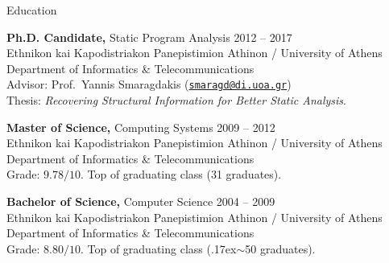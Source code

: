 \documentclass{resume}
\begin{document}
\newcommand{\mytilde}{\raise.17ex\hbox{$\scriptstyle\mathtt{\sim}$}}



\begin{rSection}{Education}

{\bf Ph.D. Candidate,} Static Program Analysis \hfill {2012 -- 2017} \\
Ethnikon kai Kapodistriakon Panepistimion Athinon / University of Athens \\
Department of Informatics \& Telecommunications \\
Advisor: Prof.~Yannis Smaragdakis
(\href{mailto:smaragd@di.uoa.gr}{\nolinkurl{smaragd@di.uoa.gr}}) \\
Thesis: \emph{Recovering Structural Information for Better Static Analysis}.

{\bf Master of Science,} Computing Systems \hfill {2009 -- 2012} \\
Ethnikon kai Kapodistriakon Panepistimion Athinon / University of Athens \\
Department of Informatics \& Telecommunications \\
Grade: $9.78 / 10$. Top of graduating class (31 graduates).

{\bf Bachelor of Science,} Computer Science \hfill {2004 -- 2009}  \\
Ethnikon kai Kapodistriakon Panepistimion Athinon / University of Athens \\
Department of Informatics \& Telecommunications \\
Grade: $8.80 / 10$. Top of graduating class (\mytilde{}50 graduates).

\end{rSection}

\end{document}
